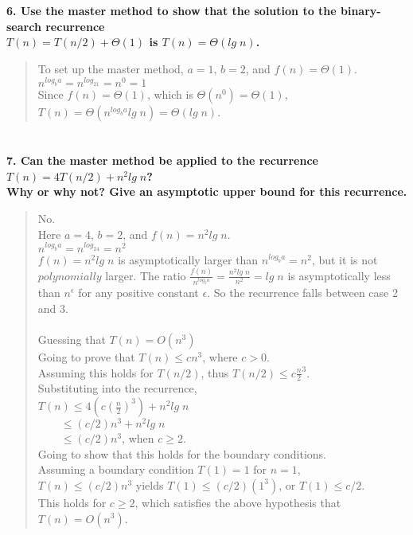 \documentclass{article}
\begin{document}
\section*{}
\textbf{6. Use the master method to show that the solution to the binary-search recurrence\\
$T(n) = T(n/2) + \Theta(1)$ is $T(n) = \Theta(lg\; n)$.}

\begin{quote}
\textsf{To set up the master method, $a = 1$, $b = 2$, and $f(n) = \Theta(1)$.\\
$n^{log_ba} = n^{log_21} = n^0 = 1$\\
Since $f(n) = \Theta(1)$, which is $\Theta(n^0) = \Theta(1)$,\\
$T(n) = \Theta(n^{log_ba}lg\; n) = \Theta(lg\; n)$.}
\end{quote}

\section*{}
\textbf{7. Can the master method be applied to the recurrence $T(n) = 4T(n/2) + n^2lg\; n$?\\
Why or why not? Give an asymptotic upper bound for this recurrence.}

\begin{quote}
\textsf{No.\\
Here $a = 4$, $b = 2$, and $f(n) = n^2lg\; n$.\\
$n^{log_ba} = n^{log_24} = n^2$\\
$f(n) = n^2lg\; n$ is asymptotically larger than $n^{log_ba} = n^2$, but it is not $polynomially$
larger. The ratio $\frac{f(n)}{n^{log_ba}} = \frac{n^2lg\; n}{n^2} = lg\; n$ is asymptotically
less than $n^{\epsilon}$ for any positive constant $\epsilon$. So the recurrence falls between
case 2 and 3.\\
\\
Guessing that $T(n) = O(n^3)$\\
Going to prove that $T(n) \leq cn^3$, where $c > 0$.\\
Assuming this holds for $T(n/2)$, thus $T(n/2) \leq c\frac{n}{2}^3$.\\
Substituting into the recurrence,\\
$T(n) \leq 4(c(\frac{n}{2})^3) + n^2lg\; n$\\
\indent$\quad\quad \leq (c/2)n^3 + n^2lg\; n$\\
\indent$\quad\quad \leq (c/2)n^3$, when $c \geq 2$.\\
Going to show that this holds for the boundary conditions.\\
Assuming a boundary condition $T(1) = 1$ for $n = 1$,\\
$T(n) \leq (c/2)n^3$ yields $T(1) \leq (c/2)(1^3)$, or $T(1) \leq c/2$.\\
This holds for $c \geq 2$, which satisfies the above hypothesis that $T(n) = O(n^3)$.}
\end{quote}
\end{document}
